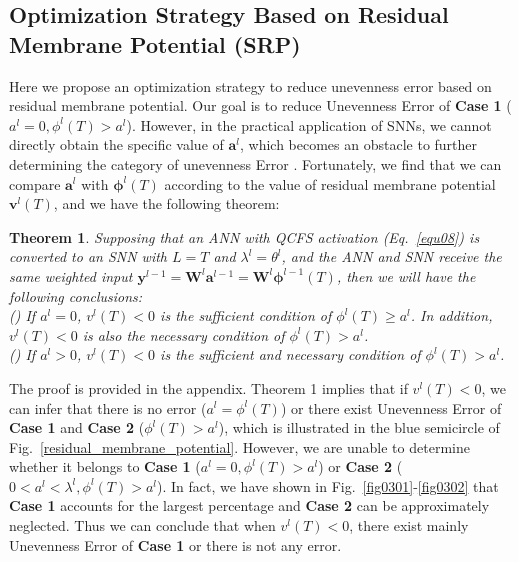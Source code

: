 \documentclass[letterpaper]{article} %
\newtheorem{theorem}{Theorem}
\begin{document}
\subsection{Optimization Strategy Based on Residual Membrane Potential (SRP)}
Here we propose an optimization strategy to reduce unevenness error based on residual membrane potential. Our goal is to reduce Unevenness Error \uppercase\expandafter{} of \textbf{Case 1} (${a}^l=0, \phi^l(T)> {a}^l$). However, in the practical application of SNNs, we cannot directly obtain the specific value of $\boldsymbol{a}^l$, which becomes an obstacle to further determining the category of unevenness Error \uppercase\expandafter{}. Fortunately, we find that we can compare $\boldsymbol{a}^l$ with $\boldsymbol{\phi}^l(T)$ according to the value of residual membrane potential $\boldsymbol{v}^l(T)$, and we have the following theorem:

\begin{theorem}
Supposing that an ANN with QCFS activation (Eq.~\eqref{equ08}) is converted to an SNN with $L=T$ and $\lambda^l={\theta}^l$, and the ANN and SNN receive the same weighted input $\boldsymbol{y}^{l-1} = \boldsymbol{W}^{l} \boldsymbol{a}^{l-1}= \boldsymbol{W}^{l}\boldsymbol{\phi}^{l-1}(T)$,
 then we will have the following conclusions:\\
() If ${a}^l=0$, ${v}^l(T)<0$ is the sufficient condition of $\phi^l(T) \geqslant{a}^l$. In addition, ${v}^l(T)<0$ is also the necessary condition of $\phi^l(T)>{a}^l$.\\
() If ${a}^l>0$, ${v}^l(T)<0$ is the sufficient and necessary condition of $\phi^l(T)>{a}^l$.
\label{thm06}
\end{theorem}





The proof is provided in the appendix. Theorem 1 implies that if ${v}^l(T)<0$, we can infer that there is no error (${a}^l={\phi}^l(T)$) or there exist Unevenness Error \uppercase\expandafter{} of \textbf{Case 1} and \textbf{Case 2} ($\phi^l(T)>{a}^l$), which is illustrated in the blue semicircle of Fig.~\ref{residual_membrane_potential}. However, we are unable to determine whether it belongs to \textbf{Case 1} (${a}^l=0, \phi^l(T)>{a}^l$) or \textbf{Case 2} ($0<{a}^l<\lambda^l,\phi^l(T)>{a}^l$). In fact, we have shown in Fig.~\ref{fig0301}-\ref{fig0302} that \textbf{Case 1} accounts for the largest percentage and \textbf{Case 2} can be approximately neglected. Thus we can conclude that when ${v}^l(T)< 0$, there exist mainly Unevenness Error \uppercase\expandafter{} of \textbf{Case 1} or there is not any error.
\end{document}
